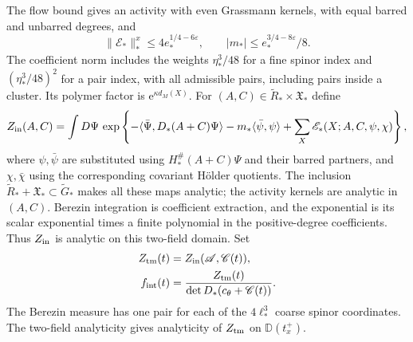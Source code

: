 The flow bound \cite[(66)]{CoverTuning}
gives an activity with even Grassmann kernels,
with equal barred and unbarred degrees, and
\begin{equation}\label{eq:interacting-activity-input}
 \|\mathscr E_*\|_*^x
       \le4e_*^{1/4-6\varepsilon},\qquad
 |m_*|\le e_*^{3/4-8\varepsilon}/8.
\end{equation}
The coefficient norm includes the weights
$\eta_*^3/48$ for a fine spinor index and
$(\eta_*^3/48)^2$ for a pair index, with all
admissible pairs, including pairs inside a cluster.
Its polymer factor is $\mathrm e^{\kappa d_M(X)}$.
For $(A,C)\in\widetilde R_*\times\mathfrak X_*$ define
\begin{equation}\label{eq:interacting-two-field-integral}
 Z_{\rm in}(A,C)=\int D\Psi\,
 \exp\left\{-\langle\bar\Psi,D_*(A+C)\Psi\rangle
       -m_*\langle\bar\psi,\psi\rangle
       +\sum_X\mathscr E_*(X;A,C,\psi,\chi)\right\},
\end{equation}
where $\psi,\bar\psi$ are substituted using
$H_*^\#(A+C)\Psi$ and their barred partners,
and $\chi,\bar\chi$ using the corresponding
covariant Hölder quotients.
The inclusion
$\widetilde R_*+\mathfrak X_*\subset\widetilde G_*$
makes all these maps analytic; the activity
kernels are analytic in $(A,C)$.
Berezin integration is coefficient extraction,
and the exponential is its scalar exponential
times a finite polynomial in the positive-degree
coefficients. Thus $Z_{\rm in}$ is analytic
on this two-field domain.
Set
\begin{align}
 Z_{\rm tm}(t)&=Z_{\rm in}(\mathscr A,\mathscr C(t)),
                               \label{eq:interacting-terminal-integral}\\
 f_{\rm int}(t)&=
   \frac{Z_{\rm tm}(t)}{\det D_*(c_\theta+\mathscr C(t))}.
                               \label{eq:interacting-factor-definition}
\end{align}
The Berezin measure has one pair for each
of the $4\ell_*^3$ coarse spinor coordinates.
The two-field analyticity gives analyticity of
$Z_{\rm tm}$ on
$\mathbb D(t_x^+)$.

